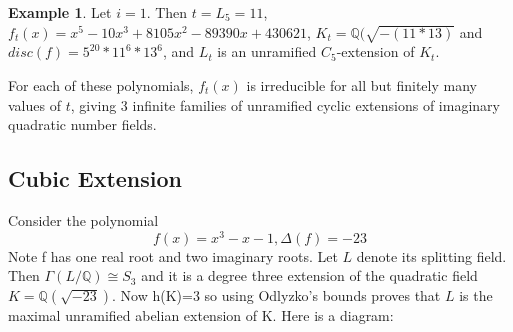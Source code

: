 \documentclass[12pt]{extarticle}
\newcommand{\Q}{\mathbb{Q}}
\newcommand{\<}{\langle}
\renewcommand{\>}{\rangle}
\theoremstyle{definition}
\newtheorem*{example}{Example}
\begin{document}
\begin{example}
Let $i=1$. Then $t=L_{5} = 11$, $f_t(x) = x^5 - 10x^3 + 8105x^2 - 89390x + 430621$, $K_t = \Q(\sqrt{-( 11*13)}$ and $disc(f) =5^{20} * 11^6 * 13^6
$,  and $L_t$ is an unramified $C_5$-extension of $K_t$. 
\end{example}
For each of these polynomials, $f_t(x)$ is irreducible for all but finitely many values of $t$, giving 3 infinite families of unramified cyclic extensions of imaginary quadratic number fields. 

\subsection{Cubic Extension}
Consider the polynomial \begin{equation}
 f(x)=x^3-x-1, \Delta(f)=-23
\end{equation}
Note f has one real root and two imaginary roots. Let $L$ denote its splitting field. Then $\Gamma(L/\mathbb{Q})\cong S_3$ and it is a degree three extension of the quadratic field $K= \mathbb{Q}(\sqrt{-23})$. Now h(K)=3 so using Odlyzko's bounds proves that $L$ is the maximal unramified abelian extension of K. Here is a diagram:
\begin{center}
\end{center}
\end{document}
